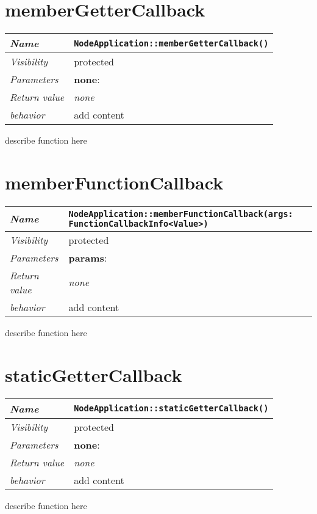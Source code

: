 \section{memberGetterCallback}
\begin{longtable}{p{3cm} @{\hskip 1cm} p{12cm}}
  \hline
  \textit{Name} & \texttt{NodeApplication::memberGetterCallback()} \\
  \hline
  \textit{Visibility} & protected \\
  \hline
  \textit{Parameters} & \textbf{none}: \\
  \hline
  \textit{Return value} & \textit{none} \\
  \hline
  \textit{behavior} & add content \\
  \hline
\end{longtable}
describe function here
\newpage


\section{memberFunctionCallback}
\begin{longtable}{p{3cm} @{\hskip 1cm} p{12cm}}
  \hline
  \textit{Name} & \texttt{NodeApplication::memberFunctionCallback(args: FunctionCallbackInfo<Value>)} \\
  \hline
  \textit{Visibility} & protected \\
  \hline
  \textit{Parameters} & \textbf{params}: \\
  \hline
  \textit{Return value} & \textit{none} \\
  \hline
  \textit{behavior} & add content \\
  \hline
\end{longtable}
describe function here
\newpage

\section{staticGetterCallback}
\begin{longtable}{p{3cm} @{\hskip 1cm} p{12cm}}
  \hline
  \textit{Name} & \texttt{NodeApplication::staticGetterCallback()} \\
  \hline
  \textit{Visibility} & protected \\
  \hline
  \textit{Parameters} & \textbf{none}: \\
  \hline
  \textit{Return value} & \textit{none} \\
  \hline
  \textit{behavior} & add content \\
  \hline
\end{longtable}
describe function here
\newpage

